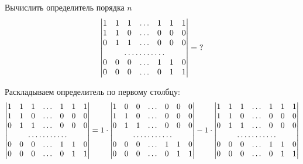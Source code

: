 \documentclass[a4paper,12pt]{article}
\begin{document}
  \begin{problem}[14.24(1)]
    Вычислить определитель порядка $n$
    \[
      \begin{vmatrix}
        1 & 1 & 1 & \ldots & 1 & 1 & 1\\
        1 & 1 & 0 & \ldots & 0 & 0 & 0\\
        0 & 1 & 1 & \ldots & 0 & 0 & 0\\
        \hdotsfor{7}\\
        0 & 0 & 0 & \ldots & 1 & 1 & 0\\
        0 & 0 & 0 & \ldots & 0 & 1 & 1
      \end{vmatrix} = \?
    \]
  \end{problem}
  
  \begin{solution}
    Раскладываем определитель по первому столбцу:
    \[
      \begin{vmatrix}
        1 & 1 & 1 & \ldots & 1 & 1 & 1\\
        1 & 1 & 0 & \ldots & 0 & 0 & 0\\
        0 & 1 & 1 & \ldots & 0 & 0 & 0\\
        \hdotsfor{7}\\
        0 & 0 & 0 & \ldots & 1 & 1 & 0\\
        0 & 0 & 0 & \ldots & 0 & 1 & 1
      \end{vmatrix}
      = 1 \cdot \begin{vmatrix}
          1 & 0 & 0 & \ldots & 0 & 0 & 0\\
          1 & 1 & 0 & \ldots & 0 & 0 & 0\\
          0 & 1 & 1 & \ldots & 0 & 0 & 0\\
          \hdotsfor{7}\\
          0 & 0 & 0 & \ldots & 1 & 1 & 0\\
          0 & 0 & 0 & \ldots & 0 & 1 & 1
        \end{vmatrix}
        - 1 \cdot \begin{vmatrix}
          1 & 1 & 1 & \ldots & 1 & 1 & 1\\
          1 & 1 & 0 & \ldots & 0 & 0 & 0\\
          0 & 1 & 1 & \ldots & 0 & 0 & 0\\
          \hdotsfor{7}\\
          0 & 0 & 0 & \ldots & 1 & 1 & 0\\
          0 & 0 & 0 & \ldots & 0 & 1 & 1
        \end{vmatrix}
    \]
    

\end{solution}
\end{document}
